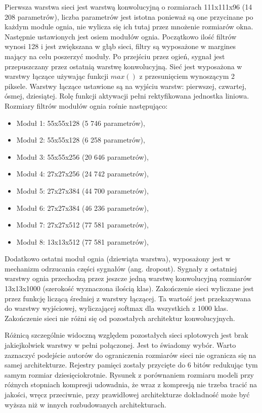 \documentclass[12pt,a4paper,twoside,titlepage,openright]{book}
\begin{document}
Pierwsza warstwa sieci jest warstwą konwolucyjną o rozmiarach 111x111x96 (14 208 parametrów), liczba parametrów jest istotna ponieważ są one przycinane po każdym module ognia, nie wylicza się ich tutaj przez mnożenie rozmiarów okna. Następnie ustawionych jest osiem modułów ognia. Początkowo ilość filtrów wynosi 128 i jest zwiększana w głąb sieci, filtry są wyposażone w margines mający na celu poszerzyć moduły. Po przejściu przez ogień, sygnał jest przepuszczany przez ostatnią warstwę konwolucyjną. Sieć jest wyposażona w warstwy łączące używając funkcji $max()$ z przesunięciem wynoszącym 2 piksele. Warstwy łączące ustawione są na wyjściu warstw: pierwszej, czwartej, ósmej, dziesiątej. Rolę funkcji aktywacji pełni rektyfikowana jednostka liniowa. Rozmiary filtrów modułów ognia rośnie następująco:
\begin{itemize}
\item Moduł 1: 55x55x128 (5 746 parametrów),
\item Moduł 2: 55x55x128 (6 258 parametrów), 
\item Moduł 3: 55x55x256 (20 646 parametrów),
\item Moduł 4: 27x27x256 (24 742 parametrów),
\item Moduł 5: 27x27x384 (44 700 parametrów),
\item Moduł 6: 27x27x384 (46 236 parametrów),
\item Moduł 7: 27x27x512 (77 581 parametrów),
\item Moduł 8: 13x13x512 (77 581 parametrów),
\end{itemize}
Dodatkowo ostatni moduł ognia (dziewiąta warstwa), wyposażony jest w mechanizm odrzucania części sygnałów (ang. dropout). Sygnały z ostatniej warstwy ognia przechodzą przez jeszcze jedną warstwę konwolucyjną rozmiarów 13x13x1000 (szerokość wyznaczona ilością klas).
Zakończenie sieci wyliczane jest przez funkcję liczącą średniej z warstwy łączącej. Ta wartość jest przekazywana do warstwy wyjściowej, wyliczającej softmax dla wszystkich z 1000 klas. Zakończenie sieci nie różni się od pozostałych architektur konwolucyjnych.

Różnicą szczególnie widoczną względem pozostałych sieci splotowych jest brak jakiejkolwiek warstwy w pełni połączonej. Jest to świadomy wybór. Warto zaznaczyć podejście autorów do ograniczenia rozmiarów sieci nie ogranicza się na samej architekturze. Rejestry pamięci zostały przycięte do 6 bitów redukując tym samym rozmiar dziesięciokrotnie. Rysunek z porównaniem rozmiaru modeli przy różnych stopniach kompresji udowadnia, że wraz z kompresją nie trzeba tracić na jakości, wręcz przeciwnie, przy prawidłowej architekturze dokładność może być wyższa niż w innych rozbudowanych architekturach. \cite{DBLP:journals/corr/IandolaMAHDK16}
\end{document}
